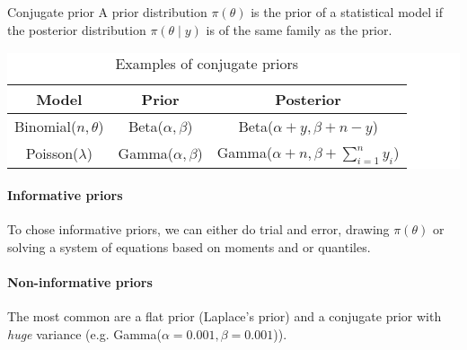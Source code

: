 \begin{definition}{Conjugate prior}{}
	A prior distribution $\pi(\theta)$ is the  prior of a statistical model
	if the posterior distribution $\pi(\theta \mid y)$ is of the same family as the prior.

	\begin{table}[H]
		\caption{Examples of conjugate priors}
		\colorbox{white}{%
			\begin{tabular}{ccc}
				\toprule
				Model                & Prior                 & Posterior                        \\
				\midrule
				Binomial($n,\theta$) & Beta($\alpha,\beta$)  & Beta($\alpha + y,\beta + n - y$) \\
                Poisson($\lambda$)   & Gamma($\alpha,\beta$) & Gamma($\alpha + n,\beta + \sum_{i=1}^n y_i$)    \\
				\bottomrule
			\end{tabular}%
		}
	\end{table}

\end{definition}

\paragraph{Informative priors}
To chose informative priors, we can either do trial and error, drawing
$\pi(\theta)$ or solving a system of equations based on moments and or quantiles.

\paragraph{Non-informative priors}
The most common are a flat prior (Laplace's prior) and a conjugate prior with
\emph{huge} variance (e.g. Gamma($\alpha=0.001,\beta=0.001$)).

